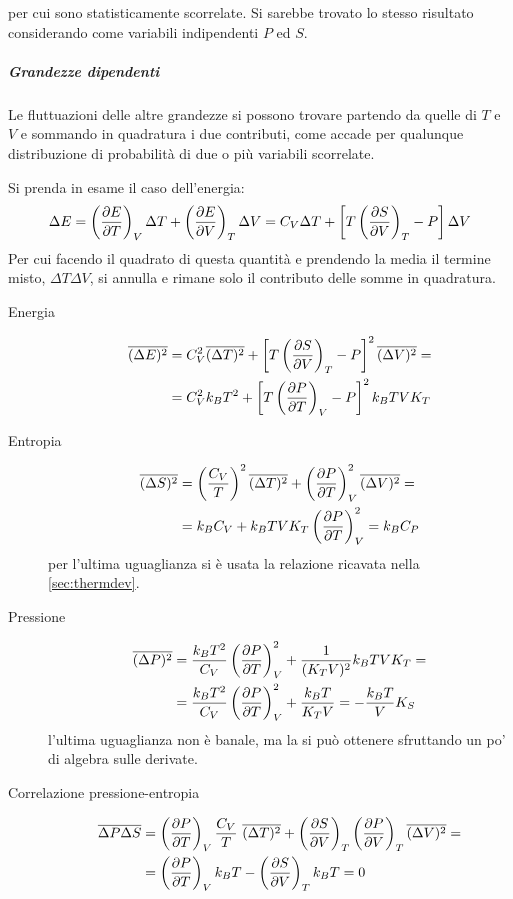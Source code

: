\noindent per cui sono statisticamente scorrelate. Si sarebbe trovato lo stesso risultato considerando come variabili indipendenti $P$ ed $S$.

\subparagraph{Grandezze dipendenti} Le fluttuazioni delle altre grandezze si possono trovare partendo da quelle di $T$ e $V$ e sommando in quadratura i due contributi, come accade per qualunque distribuzione di probabilità di due o più variabili scorrelate.

\begin{es}
	Si prenda in esame il caso dell'energia:
	\begin{equation*}
	\Delta E = \left(\frac{\partial {E}}{\partial {T}}\right)_{V} \Delta T + \left(\frac{\partial {E}}{\partial {V}}\right)_{T} \Delta V = C_V \Delta T + \left[ T \left(\frac{\partial {S}}{\partial {V}}\right)_{T} - P\right] \Delta V
	\end{equation*}
	Per cui facendo il quadrato di questa quantità e prendendo la media il termine misto, $\Delta T \Delta V$, si annulla e rimane solo il contributo delle somme in quadratura.
\end{es}

\begin{description}
	\item[Energia] 
	\begin{align*}
	\overline{(\Delta E)^2} &= C_V^2 \overline{(\Delta T)^2} + \left[T\left(\frac{\partial {S}}{\partial {V}}\right)_{T} - P\right]^2 \overline{(\Delta V)^2} =\\
	&= C_V^2 k_B T^2 + \left[T\left(\frac{\partial {P}}{\partial {T}}\right)_{V} - P\right]^2 k_B T V K_T
	\end{align*}
	\item[Entropia]
	\begin{align*}
	\overline{(\Delta S)^2} &= \left(\frac{C_V}{T}\right)^2 \overline{(\Delta T)^2} + \left(\frac{\partial {P}}{\partial {T}}\right)_{V}^2 \overline{(\Delta V)^2} =\\
	&= k_B C_V + k_B T V K_T \left(\frac{\partial {P}}{\partial {T}}\right)_{V}^2 = k_B C_P
	\end{align*}
	per l'ultima uguaglianza si è usata la relazione ricavata nella \cref{sec:thermdev}.
	\item[Pressione]
	\begin{align*}
	\overline{(\Delta P)^2} &= \frac{k_B T^2}{C_V} \left(\frac{\partial {P}}{\partial {T}}\right)_{V}^2 + \frac{1}{(K_T V)^2} k_B T V K_T=\\
	&= \frac{k_B T^2}{C_V} \left(\frac{\partial {P}}{\partial {T}}\right)_{V}^2 + \frac{k_B T}{K_T V} = - \frac{k_B T}{V} K_S
	\end{align*}
	l'ultima uguaglianza non è banale, ma la si può ottenere sfruttando un po' di algebra sulle derivate.
	\item[Correlazione pressione-entropia]
	\begin{align*}
	\overline{\Delta P \Delta S} &= \left(\frac{\partial {P}}{\partial {T}}\right)_{V} \frac{C_V}{T}~\overline{(\Delta T)^2} + \left(\frac{\partial {S}}{\partial {V}}\right)_{T} \left(\frac{\partial {P}}{\partial {V}}\right)_{T} \overline{(\Delta V)^2} =\\
	&= \left(\frac{\partial {P}}{\partial {T}}\right)_{V} k_B T - \left(\frac{\partial {S}}{\partial {V}}\right)_{T} k_B T = 0
	\end{align*}
\end{description}

